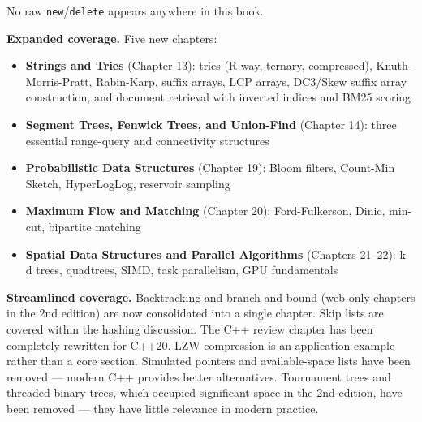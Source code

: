 No raw \texttt{new}/\texttt{delete} appears anywhere in this book.

\textbf{Expanded coverage.} Five new chapters:
\begin{itemize}
\item \textbf{Strings and Tries} (Chapter 13): tries (R-way, ternary, compressed), Knuth-Morris-Pratt, Rabin-Karp, suffix arrays, LCP arrays, DC3/Skew suffix array construction, and document retrieval with inverted indices and BM25 scoring
\item \textbf{Segment Trees, Fenwick Trees, and Union-Find} (Chapter 14): three essential range-query and connectivity structures
\item \textbf{Probabilistic Data Structures} (Chapter 19): Bloom filters, Count-Min Sketch, HyperLogLog, reservoir sampling
\item \textbf{Maximum Flow and Matching} (Chapter 20): Ford-Fulkerson, Dinic, min-cut, bipartite matching
\item \textbf{Spatial Data Structures and Parallel Algorithms} (Chapters 21–22): k-d trees, quadtrees, SIMD, task parallelism, GPU fundamentals
\end{itemize}

\textbf{Streamlined coverage.} Backtracking and branch and bound (web-only chapters in the 2nd edition) are now consolidated into a single chapter. Skip lists are covered within the hashing discussion. The C++ review chapter has been completely rewritten for C++20. LZW compression is an application example rather than a core section. Simulated pointers and available-space lists have been removed — modern C++ provides better alternatives. Tournament trees and threaded binary trees, which occupied significant space in the 2nd edition, have been removed — they have little relevance in modern practice.

